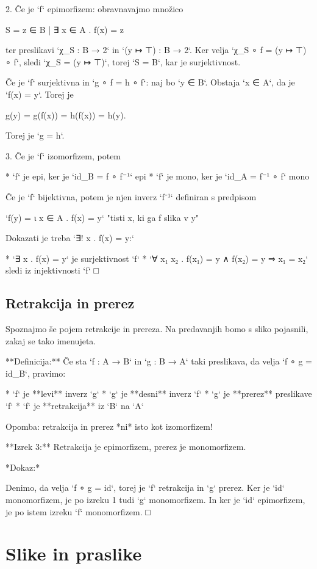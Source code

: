 2. Če je `f` epimorfizem: obravnavajmo množico

        S = { z ∈ B | ∃ x ∈ A . f(x) = z }

   ter preslikavi `χ_S : B → 2` in `(y ↦ ⊤) : B → 2`. Ker velja
   `χ_S ∘ f = (y ↦ ⊤) ∘ f`, sledi `χ_S = (y ↦ ⊤)`, torej `S = B`,
   kar je surjektivnost.

   Če je `f` surjektivna in `g ∘ f = h ∘ f`: naj bo `y ∈ B`. Obstaja
   `x ∈ A`, da je `f(x) = y`. Torej je

        g(y) = g(f(x)) = h(f(x)) = h(y).

   Torej je `g = h`.

3. Če je `f` izomorfizem, potem

    * `f` je epi, ker je `id_B = f ∘ f⁻¹` epi
    * `f` je mono, ker je `id_A = f⁻¹ ∘ f` mono

   Če je `f` bijektivna, potem je njen inverz `f⁻¹` definiran s predpisom

    `f(y) = ι x ∈ A . f(x) = y`      "tisti x, ki ga f slika v y"

   Dokazati je treba `∃! x . f(x) = y:`

   * `∃ x . f(x) = y` je surjektivnost `f`
   * `∀ x₁ x₂ . f(x₁) = y ∧ f(x₂) = y ⇒ x₁ = x₂` sledi iz injektivnosti `f`
□

\subsection{Retrakcija in prerez}

Spoznajmo še pojem retrakcije in prereza. Na predavanjih bomo s sliko pojasnili, zakaj se tako imenujeta.

**Definicija:** Če sta `f : A → B` in `g : B → A` taki preslikava, da velja `f ∘ g = id_B`, pravimo:

* `f` je **levi** inverz `g`
* `g` je **desni** inverz `f`
* `g` je **prerez** preslikave `f`
* `f` je **retrakcija** iz `B` na `A`

Opomba: retrakcija in prerez *ni* isto kot izomorfizem!

**Izrek 3:** Retrakcija je epimorfizem, prerez je monomorfizem.

*Dokaz:*

Denimo, da velja `f ∘ g = id`, torej je `f` retrakcija in `g` prerez. Ker je `id`
monomorfizem, je po izreku 1 tudi `g` monomorfizem. In ker je `id` epimorfizem, je po
istem izreku `f` monomorfizem. □


\section{Slike in praslike}

